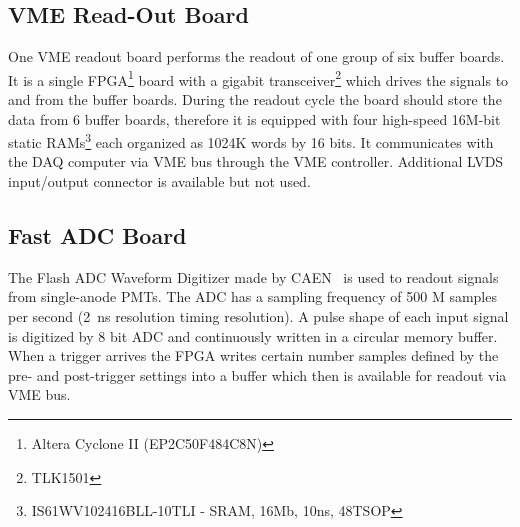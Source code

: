 \documentclass[a4paper,11pt]{article}
\begin{document}
\subsection{VME Read-Out Board}\label{electronics:subsec:vme_readout_board}

One VME readout board performs the readout of one group of six buffer boards. It is a single FPGA\footnote{Altera Cyclone II (EP2C50F484C8N)} board
with a gigabit transceiver\footnote{TLK1501} which drives the signals to and from the buffer boards. During the readout cycle the board should store
the data from 6 buffer boards, therefore it is equipped with four high-speed 16M-bit static RAMs\footnote{IS61WV102416BLL-10TLI - SRAM, 16Mb, 10ns, 48TSOP}
each organized as 1024K words by 16 bits. It communicates with the DAQ computer via VME bus through the VME controller. Additional LVDS input/output connector
is available but not used.

\subsection{Fast ADC Board}\label{electronics:subsec:fast_adc_board}

The Flash ADC Waveform Digitizer made by CAEN~\cite{V1731} is used to readout signals from single-anode PMTs. The ADC has a sampling frequency of 500 M
samples per second (2~ns resolution timing resolution). A pulse shape of each input signal is digitized by 8 bit ADC and continuously written in a circular
memory buffer. When a trigger arrives the FPGA writes certain number samples defined by the pre- and post-trigger settings into a buffer which then is
available for readout via VME bus.
\newpage



% 
\end{document}
